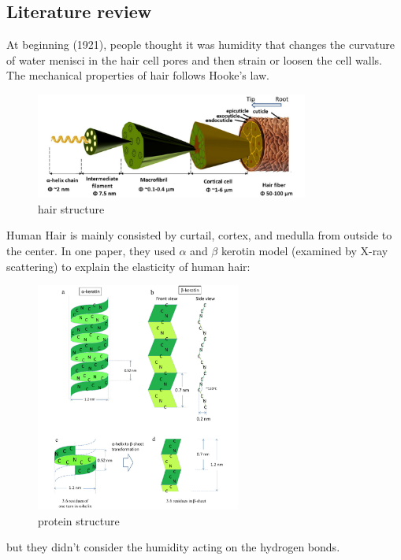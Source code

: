 \documentclass{article}
\begin{document}
\subsection{Literature review}
At beginning (1921), people thought it was humidity that changes the curvature of water menisci in the hair cell pores and then strain or loosen the cell walls. The mechanical properties of hair follows Hooke's law\citep{Whipple_1921}.
\begin{figure}[H]
    \centering
\includegraphics[width=0.8\textwidth]{hair structure.jpg}
    \caption{hair structure\citep{yu2017structure}}
    \label{hair structure}
\end{figure}
Human Hair is mainly consisted by curtail, cortex, and medulla from outside to the center. In one paper, they used $\alpha$ and $\beta$ kerotin model (examined by X-ray scattering) to explain the elasticity of human hair:
\begin{figure}[H]
    \centering
\includegraphics[width=0.6\textwidth]{protein structure.png}
    \caption{protein structure\citep{yu2017structure}}
    \label{protein structure}
\end{figure}
but they didn't consider the humidity acting on the hydrogen bonds.
\end{document}
